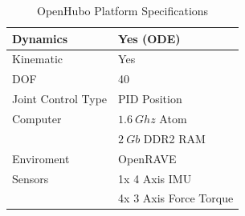 \begin{table}
\centering
\caption{OpenHubo Platform Specifications}
\begin{tabular}{| l || l |}
\hline
Dynamics      		& Yes (ODE)			\\
\hline
Kinematic		& Yes				\\
\hline
DOF			& 40				\\
\hline
Joint Control Type	& PID Position			\\
\hline
Computer		& $1.6~Ghz$ Atom		\\
			& $2~Gb$ DDR2 RAM		\\
\hline
Enviroment		& OpenRAVE\cite{diankovThesis}	\\

\hline
Sensors			& 1x 4 Axis IMU			\\
			& 4x 3 Axis Force Torque	\\
\hline
\hline
\end{tabular}
\label{table:huboOpenSensors}
\end{table}

